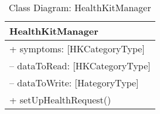 \begin{table}[H]
\centering
\caption{Class Diagram: HealthKitManager}

\hspace{1em}
\renewcommand{\arraystretch}{1.7}

\begin{tabular}{|l|}
\hline
\textbf{HealthKitManager} \\
\hline
+ symptoms: [HKCategoryType] \\
– dataToRead: [HKCategoryType] \\
– dataToWrite: [HategoryType] \\
\hdashline
+ setUpHealthRequest() \\
\hline
\end{tabular}
\end{table}
